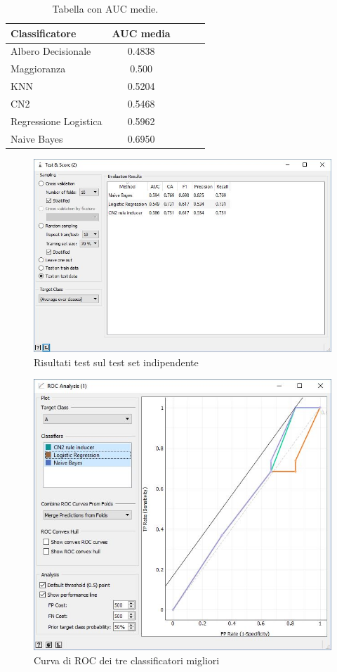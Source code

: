 \documentclass[a4paper, 12p]{report}
\begin{document}
\begin{table}
\caption{Tabella con AUC medie.}
\label{tab:2}
\begin{tabular}{|l|c|c|c|l|}
\hline
Classificatore & AUC media\\
\hline
Albero Decisionale & 0.4838\\
\hline
Maggioranza & 0.500\\
\hline
KNN & 0.5204\\
\hline
CN2 & 0.5468\\
\hline
Regressione Logistica & 0.5962 \\
\hline
Naive Bayes & 0.6950 \\
\hline
\end{tabular}
\end{table}
\begin{figure}	
	\centering
	\includegraphics[scale = 0.4]{img/score.JPG}
	\caption{Risultati test sul test set indipendente }\label{fig:6}
\end{figure}
\begin{figure}	
	\centering
	\includegraphics[scale = 0.6]{img/ROC.JPG}
	\caption{Curva di ROC dei tre classificatori migliori}\label{fig:7}
\end{figure}
\end{document}
